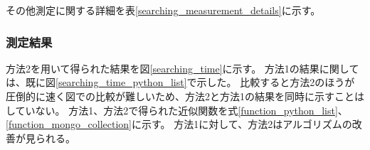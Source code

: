 その他測定に関する詳細を表\ref{searching_measurement_details}に示す。

\begin{table}[tbp]
\begin{center}
\caption[検索機能処理時間測定の詳細]{検索機能処理時間測定の詳細。測定を行った試験結果数、回数、キーワード、検索モード、検索情報の詳細を示している。}
\label{searching_measurement_details}
\end{center}
\end{table}

\subsubsection{測定結果}

方法2を用いて得られた結果を図\ref{searching_time}に示す。
方法1の結果に関しては、既に図\ref{searching_time_python_list}で示した。
比較すると方法2のほうが圧倒的に速く図での比較が難しいため、方法2と方法1の結果を同時に示すことはしていない。
方法1、方法2で得られた近似関数を式\ref{function_python_list}、\ref{function_mongo_collection}に示す。
方法1に対して、方法2はアルゴリズムの改善が見られる。

